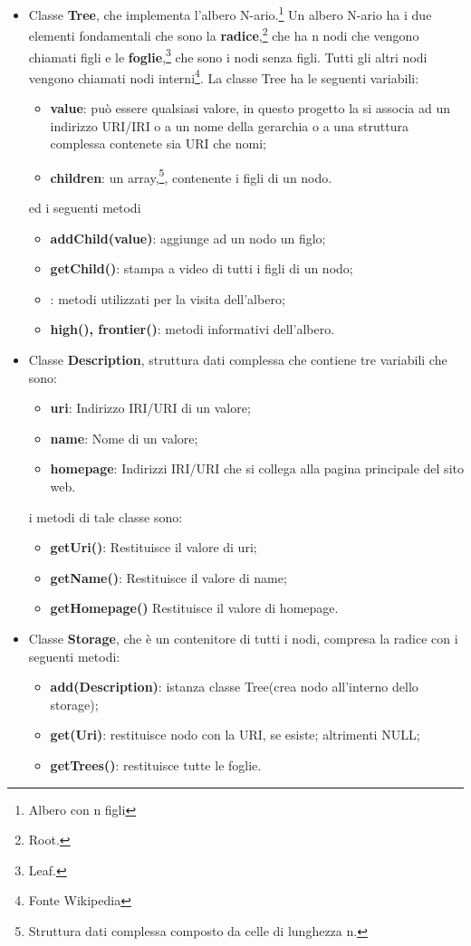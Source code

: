 \documentclass[a4paper,11pt]{article}
\begin{document}
\begin{itemize}
	\item Classe \textbf{Tree}, che implementa l'albero N-ario.\footnote{Albero con n figli} Un albero N-ario ha i due elementi fondamentali che sono la \textbf{radice},\footnote{Root.} che ha n nodi che vengono chiamati figli e le \textbf{foglie},\footnote{Leaf.} che sono i nodi senza figli. Tutti gli altri nodi vengono chiamati nodi interni\footnote{Fonte Wikipedia}.
La classe Tree	ha le seguenti variabili:
\begin{itemize}
	\item \textbf{value}: può essere qualsiasi valore, in questo progetto la si associa ad un indirizzo URI/IRI o a un nome della gerarchia o a una struttura complessa contenete sia URI che nomi;
	\item \textbf{children}: un array,\footnote{Struttura dati complessa composto da celle di lunghezza n.}, contenente i figli di un nodo.
\end{itemize}
ed i seguenti metodi
\begin{itemize}
	\item \textbf{addChild(value)}: aggiunge ad un nodo un figlo;
	\item \textbf{getChild()}: stampa a video di tutti i figli di un nodo;
	\item {}: metodi utilizzati per la visita dell'albero;
	\item \textbf{high(), frontier()}: metodi informativi dell'albero.
\end{itemize}			
	\item Classe \textbf{Description}, struttura dati complessa che contiene tre variabili che sono:
\begin{itemize}
	\item \textbf{uri}: Indirizzo IRI/URI di un valore;
	\item \textbf{name}: Nome di un valore;
	\item \textbf{homepage}: Indirizzi IRI/URI che si collega alla pagina principale del sito web.
\end{itemize}	
i metodi di tale classe sono:
\begin{itemize}
	\item \textbf{getUri()}: Restituisce il valore di uri;
	\item \textbf{getName()}: Restituisce il valore di name;
	\item \textbf{getHomepage()} Restituisce il valore di homepage.
\end{itemize} \newpage
\item Classe \textbf{Storage}, che è un contenitore di tutti i nodi, compresa la radice con i seguenti metodi:
\begin{itemize}
	\item \textbf{add(Description)}: istanza classe Tree(crea nodo all'interno dello storage);
	\item \textbf{get(Uri)}: restituisce nodo con la URI, se esiste; altrimenti NULL;
	\item \textbf{getTrees()}: restituisce tutte le foglie.
\end{itemize}
\end{itemize}	
\end{document}
